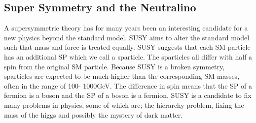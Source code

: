 \subsection{Super Symmetry and the Neutralino}
A supersymmetric theory has for many years been an interesting candidate for a new physics beyond the standard 
model. \ac{SUSY} aims to alter the standard model such that mass and force is treated equally. 
\ac{SUSY} suggests that each \ac{SM} particle has an additional \ac{SP} which we call a sparticle. 
The sparticles all differ with half a spin from the original \ac{SM} particle. Because \ac{SUSY} is a broken symmetry, 
sparticles are expected to be much higher than the corresponding \ac{SM} masses, often in the range of 100- 1000GeV. 
The difference in spin means that the \ac{SP} of a fermion is a boson and the \ac{SP} of a boson is a fermion. \ac{SUSY} is a 
candidate to fix many problems in physics, some of which are; the hierarchy problem, fixing the mass of the higgs 
and possibly the mystery of dark matter.
